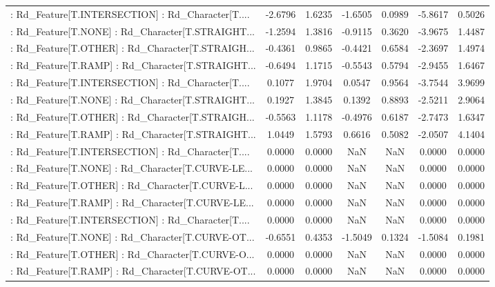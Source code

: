 \begin{longtable}{p{4cm}cccccc}
 : Rd\_Feature[T.INTERSECTION] : Rd\_Character[T.... & -2.6796 &    1.6235 & -1.6505 &       0.0989 & -5.8617 &  0.5026 \\
 : Rd\_Feature[T.NONE] : Rd\_Character[T.STRAIGHT... & -1.2594 &    1.3816 & -0.9115 &       0.3620 & -3.9675 &  1.4487 \\
 : Rd\_Feature[T.OTHER] : Rd\_Character[T.STRAIGH... & -0.4361 &    0.9865 & -0.4421 &       0.6584 & -2.3697 &  1.4974 \\
 : Rd\_Feature[T.RAMP] : Rd\_Character[T.STRAIGHT... & -0.6494 &    1.1715 & -0.5543 &       0.5794 & -2.9455 &  1.6467 \\
 : Rd\_Feature[T.INTERSECTION] : Rd\_Character[T.... &  0.1077 &    1.9704 &  0.0547 &       0.9564 & -3.7544 &  3.9699 \\
 : Rd\_Feature[T.NONE] : Rd\_Character[T.STRAIGHT... &  0.1927 &    1.3845 &  0.1392 &       0.8893 & -2.5211 &  2.9064 \\
 : Rd\_Feature[T.OTHER] : Rd\_Character[T.STRAIGH... & -0.5563 &    1.1178 & -0.4976 &       0.6187 & -2.7473 &  1.6347 \\
 : Rd\_Feature[T.RAMP] : Rd\_Character[T.STRAIGHT... &  1.0449 &    1.5793 &  0.6616 &       0.5082 & -2.0507 &  4.1404 \\
 : Rd\_Feature[T.INTERSECTION] : Rd\_Character[T.... &  0.0000 &    0.0000 &     NaN &          NaN &  0.0000 &  0.0000 \\
 : Rd\_Feature[T.NONE] : Rd\_Character[T.CURVE-LE... &  0.0000 &    0.0000 &     NaN &          NaN &  0.0000 &  0.0000 \\
 : Rd\_Feature[T.OTHER] : Rd\_Character[T.CURVE-L... &  0.0000 &    0.0000 &     NaN &          NaN &  0.0000 &  0.0000 \\
 : Rd\_Feature[T.RAMP] : Rd\_Character[T.CURVE-LE... &  0.0000 &    0.0000 &     NaN &          NaN &  0.0000 &  0.0000 \\
 : Rd\_Feature[T.INTERSECTION] : Rd\_Character[T.... &  0.0000 &    0.0000 &     NaN &          NaN &  0.0000 &  0.0000 \\
 : Rd\_Feature[T.NONE] : Rd\_Character[T.CURVE-OT... & -0.6551 &    0.4353 & -1.5049 &       0.1324 & -1.5084 &  0.1981 \\
 : Rd\_Feature[T.OTHER] : Rd\_Character[T.CURVE-O... &  0.0000 &    0.0000 &     NaN &          NaN &  0.0000 &  0.0000 \\
 : Rd\_Feature[T.RAMP] : Rd\_Character[T.CURVE-OT... &  0.0000 &    0.0000 &     NaN &          NaN &  0.0000 &  0.0000 \\

\end{longtable}
